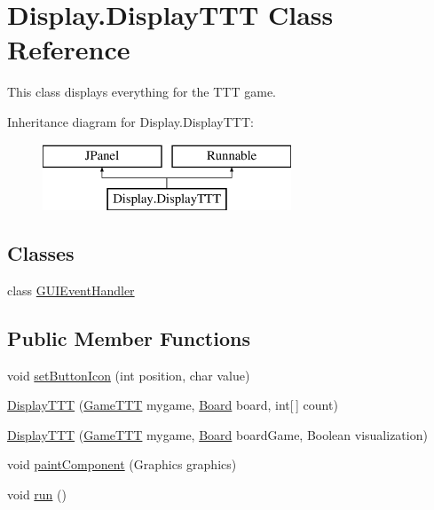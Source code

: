 \hypertarget{class_display_1_1_display_t_t_t}{}\section{Display.\+Display\+T\+T\+T Class Reference}
\label{class_display_1_1_display_t_t_t}


This class displays everything for the T\+T\+T game.  


Inheritance diagram for Display.\+Display\+T\+T\+T\+:\begin{figure}[H]
\begin{center}
\leavevmode
\includegraphics[height=2.000000cm]{class_display_1_1_display_t_t_t}
\end{center}
\end{figure}
\subsection*{Classes}
\begin{DoxyCompactItemize}
\item 
class \hyperlink{class_display_1_1_display_t_t_t_1_1_g_u_i_event_handler}{G\+U\+I\+Event\+Handler}
\end{DoxyCompactItemize}
\subsection*{Public Member Functions}
\begin{DoxyCompactItemize}
\item 
void \hyperlink{class_display_1_1_display_t_t_t_a8e33c12c8d44efe24ad731221329fc85}{set\+Button\+Icon} (int position, char value)
\item 
\hyperlink{class_display_1_1_display_t_t_t_a2c3b14ea1ac44f89006718c20e00b612}{Display\+T\+T\+T} (\hyperlink{class_game_1_1_game_t_t_t}{Game\+T\+T\+T} mygame, \hyperlink{class_board_1_1_board}{Board} board, int\mbox{[}$\,$\mbox{]} count)
\item 
\hyperlink{class_display_1_1_display_t_t_t_a3ccc11c3b13311bc0ae2ce71a2b2dec4}{Display\+T\+T\+T} (\hyperlink{class_game_1_1_game_t_t_t}{Game\+T\+T\+T} mygame, \hyperlink{class_board_1_1_board}{Board} board\+Game, Boolean visualization)
\item 
void \hyperlink{class_display_1_1_display_t_t_t_a6ec07c14b618df7f4c10037ee12d3685}{paint\+Component} (Graphics graphics)
\item 
void \hyperlink{class_display_1_1_display_t_t_t_a3b66c11e8632e24ba72e1f36f3c2307a}{run} ()
\end{DoxyCompactItemize}
